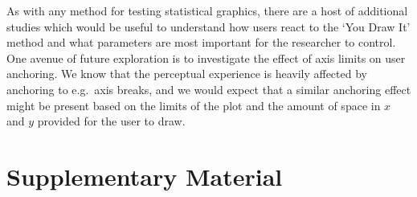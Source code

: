 \documentclass[
]{jds}
\begin{document}
As with any method for testing statistical graphics, there are a host of
additional studies which would be useful to understand how users react
to the `You Draw It' method and what parameters are most important for
the researcher to control. One avenue of future exploration is to
investigate the effect of axis limits on user anchoring. We know that
the perceptual experience is heavily affected by anchoring to e.g.~axis
breaks, and we would expect that a similar anchoring effect might be
present based on the limits of the plot and the amount of space in \(x\)
and \(y\) provided for the user to draw.

\hypertarget{supplementary-material}{%
\section*{Supplementary Material}\label{supplementary-material}}
\end{document}
